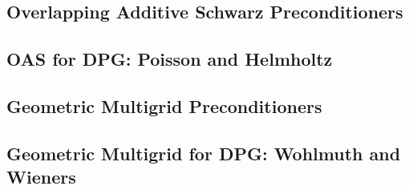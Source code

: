 \subsection{Overlapping Additive Schwarz Preconditioners}

\subsection{OAS for DPG: Poisson and Helmholtz}

\subsection{Geometric Multigrid Preconditioners}

\subsection{Geometric Multigrid for DPG: Wohlmuth and Wieners} %

